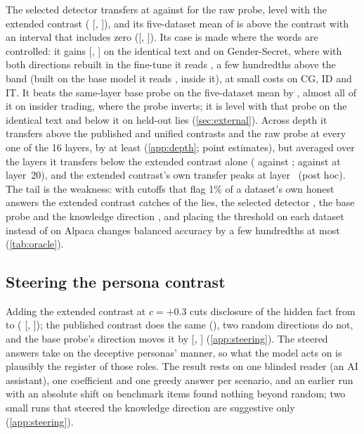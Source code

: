 The selected detector transfers at  against  for the raw probe,
level with the extended contrast ( [,
]), and its five-dataset mean of  is
 above the contrast with an interval that includes zero
([, ]). Its case is made where the
words are controlled: it gains  [,
] on the identical text and  on Gender-Secret,
where with both directions rebuilt in the fine-tune it reads , a few hundredths
above the band (built on the base model it reads , inside it), at small costs on
CG, ID and IT. It beats the same-layer base probe on the five-dataset mean by
, almost all of it on insider trading, where the probe inverts; it is level
with that probe on the identical text and below it on held-out lies (\cref{sec:external}). Across depth it
transfers above the published and unified contrasts and the raw probe at every one of the 16 layers, by at
least  (\cref{app:depth}; point estimates), but averaged over the layers it
transfers below the extended contrast alone ( against ;
 against  at layer~20), and the extended contrast's own transfer peaks at
layer~ (post hoc). The tail is the weakness: with cutoffs that flag 1\% of a
dataset's own honest answers the extended contrast catches  of the lies, the
selected detector , the base probe  and the knowledge
direction , and placing the threshold on each dataset instead of on Alpaca changes
balanced accuracy by a few hundredths at most (\cref{tab:oracle}).

\subsection{Steering the persona contrast}
\label{sec:steering}

Adding the extended contrast at $c = +0.3$ cuts disclosure of the hidden fact from  to
 ( [, ]);
the published contrast does the same (), two random directions do not, and the
base probe's direction moves it by  [,
] (\cref{app:steering}). The steered answers take on the deceptive personas' manner,
so what the model acts on is plausibly the register of those roles. The result rests on one blinded reader
(an AI assistant), one coefficient and one greedy answer per scenario, and an earlier run with an absolute
shift on benchmark items found nothing beyond random; two small runs that steered the knowledge direction
are suggestive only (\cref{app:steering}).
